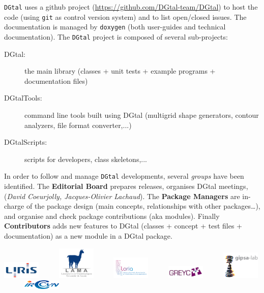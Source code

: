 \documentclass[11pt, a4paper]{article}
\def\DGtal{\texttt{DGtal} }
\begin{document}
\DGtal uses a github project
(\url{https://github.com/DGtal-team/DGtal})  to host the code
(using \texttt{git} as control version system) and to list open/closed
issues. The documentation is managed by \texttt{doxygen} (both user-guides and
technical documentation). 
The \DGtal project is composed of several sub-projects:
\begin{description}
  \item[{DGtal}:] the main library (classes + unit tests + example programs
    + documentation files)
\item[{DGtalTools}:] command line tools built using DGtal (multigrid shape generators,
    contour analyzers, file format converter,...)
\item[{DGtalScripts}:] scripts for developers,  class skeletons,...  
\end{description}
In order to follow and manage \DGtal developments, several
\emph{groups} have been identified. The \textbf{Editorial Board}
prepares releases, organises DGtal meetings, (\emph{David Coeurjolly,
  Jacques-Olivier Lachaud}). The \textbf{Package Managers} are
in-charge of the package design (main concepts, relationships with
other packages\ldots), and organise and check package contributions
(aka modules). Finally \textbf{Contributors} adds new features to
DGtal (classes + concept + test
      files + documentation) as a new module in a DGtal package.
\begin{center}
  \includegraphics[width=1.8cm]{liris-logo}~~~~~
  \includegraphics[width=1.8cm]{lama-logo}~~~~~
  \includegraphics[width=1.8cm]{loria-logo_new}~~~~~
  \includegraphics[width=1.8cm]{greyc-logo}~~~~~
  \includegraphics[width=1.8cm]{gipsa-logo}~~~~~
  \includegraphics[width=1.8cm]{irccyn_transparent}
\end{center}
\end{document}
